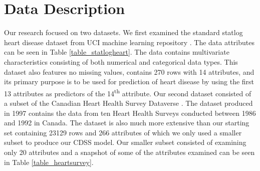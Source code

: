 \documentclass[conference]{IEEEtran}
\begin{document}
\section{Data Description}
Our research focused on two datasets. We first examined the standard statlog heart disease dataset from UCI machine learning repository \cite{StatlogHeart}.  The data attributes can be seen in Table \ref{table_statlogheart}.  The data contains multivariate characteristics consisting of both numerical and categorical data types.
This dataset also features no missing values, contains 270 rows with 14 attributes, and its primary purpose is to be used for prediction of heart disease by using the first 13 attributes as predictors of the 14\textsuperscript{th} attribute.
Our second dataset consisted of a subset of the Canadian Heart Health Survey Dataverse \cite{HealthSurvey}. The dataset produced in 1997 contains the data from ten Heart Health Surveys conducted between 1986 and 1992 in Canada. The dataset is also much more extensive than our starting set containing 23129 rows and 266 attributes of which we only used a smaller subset to produce our CDSS model.
Our smaller subset consisted of examining only 20 attributes and a snapshot of some of the attributes examined can be seen in Table \ref{table_heartsurvey}.
\end{document}
